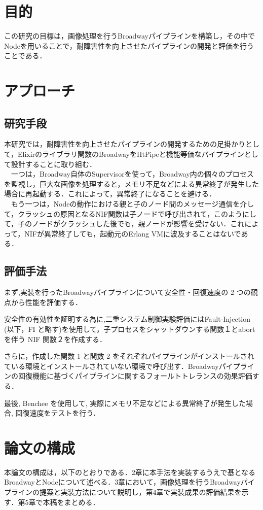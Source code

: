 \documentclass[a4paper]{jreport}	%
\begin{document}
\section{目的}
この研究の目標は，画像処理を行うBroadwayパイプラインを構築し，その中でNodeを用いることで，耐障害性を向上させたパイプラインの開発と評価を行うことである．
\section{アプローチ}
\subsection{研究手段}
本研究では，耐障害性を向上させたパイプラインの開発するための足掛かりとして，Elixirのライブラリ関数のBroadwayをHtPipeと機能等価なパイプラインとして設計することに取り組む．
\\　一つは，Broadway自体のSupervisorを使って，Broadway内の個々のプロセスを監視し，巨大な画像を処理すると，メモリ不足などによる異常終了が発生した場合に再起動する．これによって，異常終了になることを避ける．
\\　もう一つは，Nodeの動作における親と子のノード間のメッセージ通信を介して，クラッシュの原因となるNIF関数は子ノードで呼び出されて，このようにして，子のノードがクラッシュした後でも，親ノードが影響を受けない．これによって，NIFが異常終了しても，起動元のErlang VMに波及することはないである．
\subsection{評価手法}
まず,実装を行ったBroadwayパイプラインについて安全性・回復速度の 2 つの観点から性能を評価する．

安全性の有効性を証明する為に,二重システム制御実験評価にはFault-Injection (以下，FI と略す)を使用して，子プロセスをシャットダウンする関数１とabortを伴う NIF 関数２を作成する．

さらに，作成した関数 1 と関数 2 をそれぞれパイプラインがインストールされている環境とインストールされていない環境で呼び出す．Broadwayパイプラインの回復機能に基づくパイプラインに関するフォールトトレランスの効果評価する．

最後, Benchee を使用して, 実際にメモリ不足などによる異常終了が発生した場合, 回復速度をテストを行う．
\section{論文の構成}
本論文の構成は，以下のとおりである．2章に本手法を実装するうえで基となるBroadwayとNodeについて述べる．3章において，画像処理を行うBroadwayパイプラインの提案と実装方法について説明し，第4章で実装成果の評価結果を示す．第5章で本稿をまとめる．
\end{document}
